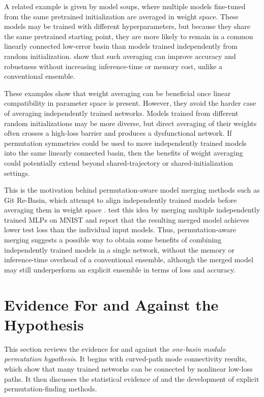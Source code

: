 \documentclass[11pt,a4paper]{report}
\begin{document}
A related example is given by model soups, where multiple models fine-tuned from 
the same pretrained initialization are averaged in weight space. These models may 
be trained with different hyperparameters, but because they share the same 
pretrained starting point, they are more likely to remain in a common linearly 
connected low-error basin than models trained independently from random 
initialization. \citet{wortsman2022model} show that such averaging can improve 
accuracy and robustness without increasing inference-time or memory cost, unlike a 
conventional ensemble.

These examples show that weight averaging can be beneficial once linear 
compatibility in parameter space is present. However, they avoid the harder case 
of averaging independently trained networks. Models trained from different random 
initializations may be more diverse, but direct averaging of their weights often 
crosses a high-loss barrier and produces a dysfunctional network. If permutation 
symmetries could be used to move independently trained models into the same 
linearly connected basin, then the benefits of weight averaging could potentially 
extend beyond shared-trajectory or shared-initialization settings.

This is the motivation behind permutation-aware model merging methods such as Git 
Re-Basin, which attempt to align independently trained models before averaging 
them in weight space \citep{ainsworth2023git}. \citet{ainsworth2023git} test this 
idea by merging multiple independently trained MLPs on MNIST and report that the 
resulting merged model achieves lower test loss than the individual input models. 
Thus, permutation-aware merging suggests a possible way to obtain some benefits of 
combining independently trained models in a single network, without the memory or 
inference-time overhead of a conventional ensemble, although the merged model may 
still underperform an explicit ensemble in terms of loss and accuracy.

\section{Evidence For and Against the Hypothesis}
\label{sec:literature}

This section reviews the evidence for and against the \textit{one-basin modulo 
permutation hypothesis}. It begins with curved-path mode connectivity results, 
which show that many trained networks can be connected by nonlinear low-loss paths. 
It then discusses the statistical evidence of \citet{entezari2021role} and the 
development of explicit permutation-finding methods.
\end{document}
